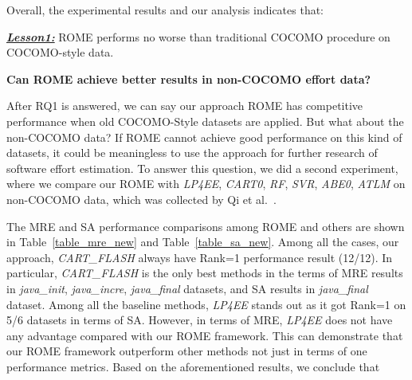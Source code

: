 \documentclass[sigconf,review]{acmart}
\newenvironment{result}[2]
{\begin{myshadowbox}\textbf{\textit{\underline{Lesson#1:}}} #2}{ 
\end{myshadowbox}}
\begin{document}
Overall, the experimental results and our analysis indicates that:
 
 \begin{result}{1}
ROME performs no worse than traditional COCOMO procedure on COCOMO-style data.
 \end{result}

{\bf Can ROME achieve better results in non-COCOMO effort data?}

After RQ1 is answered, we can say our approach ROME has competitive performance when old COCOMO-Style datasets are applied. But what about the non-COCOMO data? If ROME cannot achieve good performance on this kind of datasets, it could be meaningless to use the approach for further research of software effort estimation. To answer this question, we did a second experiment, where we compare our ROME with {\it LP4EE}, {\it CART0}, {\it RF}, {\it SVR}, {\it ABE0}, {\it ATLM} on non-COCOMO data, which was collected by Qi et al.~\cite{qi2017software}.



The MRE and SA performance comparisons among ROME and others are shown in  Table~\ref{table_mre_new} and Table~\ref{table_sa_new}. Among all the cases, our approach, {\it CART\_FLASH} always have Rank=1 performance result (12/12). In particular, {\it CART\_FLASH} is the only best methods in the terms of MRE results in {\it java\_init}, {\it java\_incre}, {\it java\_final} datasets, and SA results in {\it java\_final} dataset. Among all the baseline methods, {\it LP4EE} stands out as it got Rank=1 on 5/6 datasets in terms of SA. However, in terms of MRE, {\it LP4EE} does not have any advantage compared with our ROME framework. This can demonstrate that our ROME framework outperform other methods not just in terms of one performance metrics. 
Based on the aforementioned results, we conclude that
\end{document}
